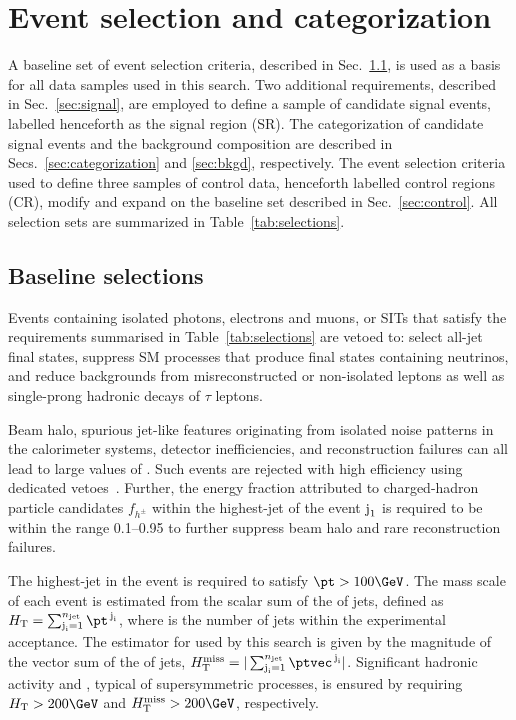 \clearpage
\section{Event selection and categorization}
\label{sec:selection}

A baseline set of event selection criteria, described in
Sec.~\ref{sec:baseline}, is used as a basis for all data samples used
in this search. Two additional requirements, described in
Sec.~\ref{sec:signal}, are employed to define a sample of candidate
signal events, labelled henceforth as the signal region (SR). The
categorization of candidate signal events and the background
composition are described in Secs.~\ref{sec:categorization} and
\ref{sec:bkgd}, respectively. The event selection criteria used to
define three samples of control data, henceforth labelled control
regions (CR), modify and expand on the baseline set described in
Sec.~\ref{sec:control}. All selection sets are summarized in
Table~\ref{tab:selections}.

\subsection{Baseline selections}
\label{sec:baseline}

Events containing isolated photons, electrons and muons, or SITs that
satisfy the requirements summarised in Table~\ref{tab:selections} are
vetoed to: select all-jet final states, suppress SM processes that
produce final states containing neutrinos, and reduce backgrounds from
misreconstructed or non-isolated leptons as well as single-prong
hadronic decays of $\tau$ leptons.

Beam halo, spurious jet-like features originating from isolated noise
patterns in the calorimeter systems, detector inefficiencies, and
reconstruction failures can all lead to large values of \ptmiss. Such
events are rejected with high efficiency using dedicated
vetoes~\cite{CMS-PAS-JME-16-004, Khachatryan:2014gga}. Further, the
energy fraction attributed to charged-hadron particle candidates
$f_{h^{\pm}}$ within the highest-\pt jet of the event $\text{j}_\text{1}$ is
required to be within the range 0.1--0.95 to further suppress beam
halo and rare reconstruction failures.

The highest-\pt jet in the event is required to satisfy $\pt >
100\GeV$. The mass scale of each event is estimated from the scalar
sum of the \pt of jets, defined as $\scalht = \sum_{\jet{i} =
  1}^{\njet} \pt^{\,\jet{i}}$, where \njet is the number of jets
within the experimental acceptance. The estimator for \ptvecmiss used
by this search is given by the magnitude of the vector sum of the \pt
of jets, $\mht = |\sum_{\jet{i} = 1}^{\njet}
\ptvec^{\,\jet{i}}|$. Significant hadronic activity and \ptvecmiss,
typical of supersymmetric processes, is ensured by requiring $\scalht
> 200\GeV$ and $\mht > 200\GeV$, respectively.

